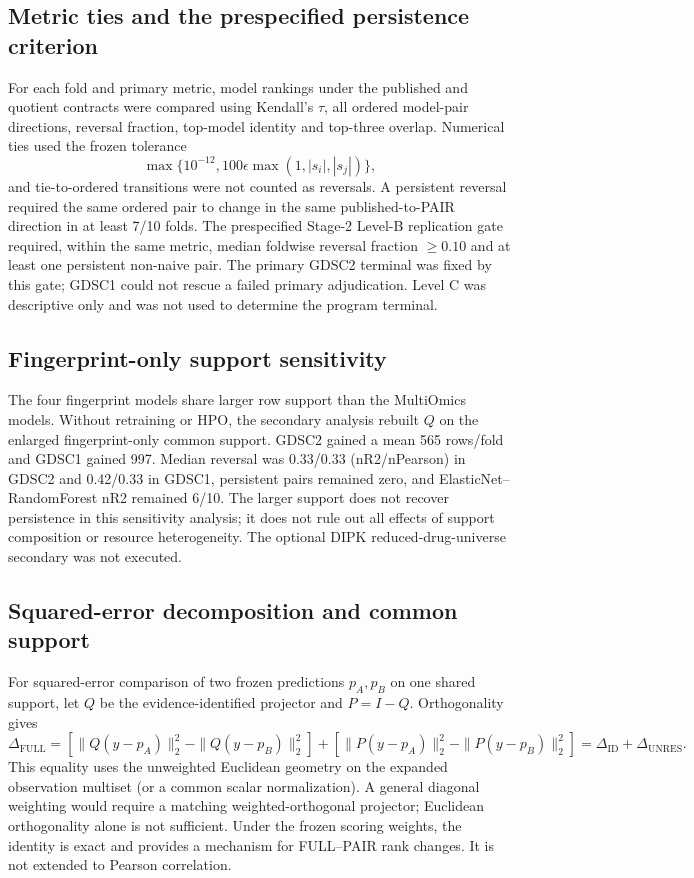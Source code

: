 \documentclass[11pt]{article}
\begin{document}
\subsection{Metric ties and the prespecified persistence criterion}
For each fold and primary metric, model rankings under the published and quotient contracts were compared using Kendall's $\tau$, all ordered model-pair directions, reversal fraction, top-model identity and top-three overlap. Numerical ties used the frozen tolerance
\[
\max\{10^{-12},100\epsilon\max(1,|s_i|,|s_j|)\},
\]
and tie-to-ordered transitions were not counted as reversals. A persistent reversal required the same ordered pair to change in the same published-to-PAIR direction in at least 7/10 folds. The prespecified Stage-2 Level-B replication gate required, within the same metric, median foldwise reversal fraction $\ge0.10$ and at least one persistent non-naive pair. The primary GDSC2 terminal was fixed by this gate; GDSC1 could not rescue a failed primary adjudication. Level C was descriptive only and was not used to determine the program terminal.


\subsection{Fingerprint-only support sensitivity}
The four fingerprint models share larger row support than the MultiOmics models. Without retraining or HPO, the secondary analysis rebuilt $Q$ on the enlarged fingerprint-only common support. GDSC2 gained a mean 565 rows/fold and GDSC1 gained 997. Median reversal was 0.33/0.33 (nR2/nPearson) in GDSC2 and 0.42/0.33 in GDSC1, persistent pairs remained zero, and ElasticNet--RandomForest nR2 remained 6/10. The larger support does not recover persistence in this sensitivity analysis; it does not rule out all effects of support composition or resource heterogeneity. The optional DIPK reduced-drug-universe secondary was not executed.


\subsection{Squared-error decomposition and common support}
For squared-error comparison of two frozen predictions $p_A,p_B$ on one shared support, let $Q$ be the evidence-identified projector and $P=I-Q$. Orthogonality gives
\[
\Delta_{\mathrm{FULL}}
=
\left[\|Q(y-p_A)\|_2^2-\|Q(y-p_B)\|_2^2\right]
+
\left[\|P(y-p_A)\|_2^2-\|P(y-p_B)\|_2^2\right]
=
\Delta_{\mathrm{ID}}+\Delta_{\mathrm{UNRES}}.
\]
This equality uses the unweighted Euclidean geometry on the expanded observation multiset (or a common scalar normalization). A general diagonal weighting would require a matching weighted-orthogonal projector; Euclidean orthogonality alone is not sufficient. Under the frozen scoring weights, the identity is exact and provides a mechanism for FULL--PAIR rank changes. It is not extended to Pearson correlation.
\end{document}
